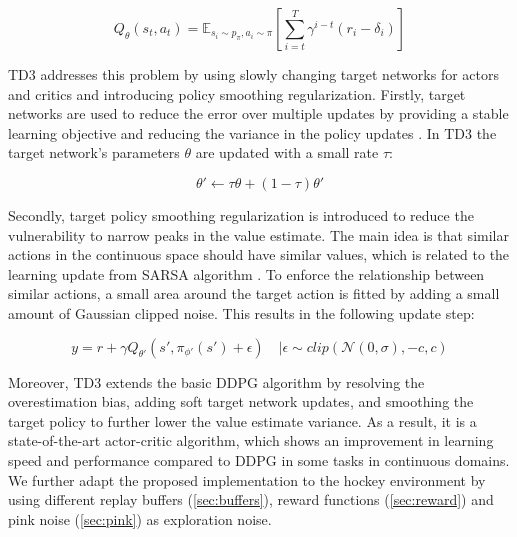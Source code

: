 \begin{equation}
    Q_\theta(s_t,a_t) = \mathbb{E}_{s_i \sim p_{\pi}, a_i \sim \pi} \left[\sum_{i=t}^{T}\gamma^{i-t}(r_i - \delta_i)\right]
\end{equation}


\ac{TD3} addresses this problem by using slowly changing target networks for actors and critics and introducing policy smoothing regularization. Firstly, target networks are used to reduce the error over multiple updates by providing a stable learning objective and reducing the variance in the policy updates \cite{fujimoto2018:TD3}. In \ac{TD3} the target network's parameters $\theta$ are updated with a small rate $\tau$:

\begin{equation}
    \theta' \leftarrow \tau \theta + (1 - \tau) \theta'
\end{equation}

Secondly, target policy smoothing regularization is introduced to reduce the vulnerability to narrow peaks in the value estimate. The main idea is that similar actions in the continuous space should have similar values, which is related to the learning update from \ac{SARSA} algorithm \cite{sutton1999:SARSA}. To enforce the relationship between similar actions, a small area around the target action is fitted by adding a small amount of Gaussian clipped noise. This results in the following update step:

\begin{equation}
    y = r + \gamma Q_{\theta'}(s', \pi_{\phi'}(s') + \epsilon) \quad | \epsilon \sim clip(\mathcal{N}(0, \sigma), -c, c)
\end{equation}

Moreover, \ac{TD3} extends the basic \ac{DDPG} algorithm \cite{lillicrap2015DDPG} by resolving the overestimation bias, adding soft target network updates, and smoothing the target policy to further lower the value estimate variance. As a result, it is a state-of-the-art actor-critic algorithm, which shows an improvement in learning speed and performance compared to \ac{DDPG} in some tasks in continuous domains. We further adapt the proposed implementation to the hockey environment by using different replay buffers (\autoref{sec:buffers}), reward functions (\autoref{sec:reward}) and pink noise (\autoref{sec:pink}) as exploration noise.
